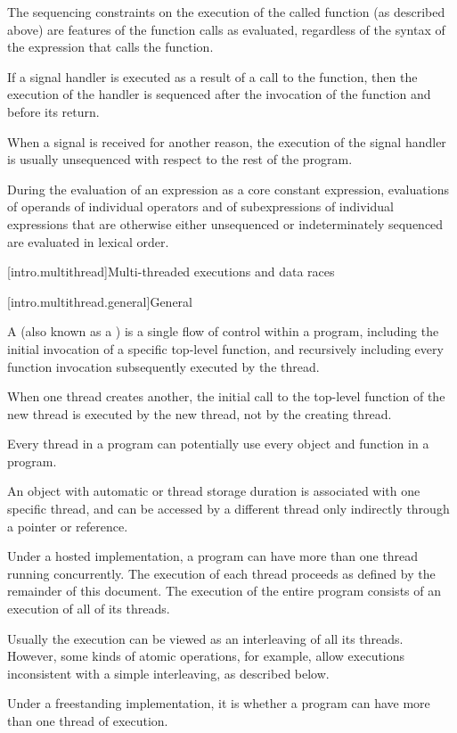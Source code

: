 \pnum
The sequencing constraints on the execution of the called function (as
described above) are features of the function calls as evaluated,
regardless of the syntax of the expression that calls the function.%
%

%
%
\pnum
If a signal handler is executed as a result of a call to the 
function, then the execution of the handler is sequenced after the invocation
of the  function and before its return.
\begin{note}
When a signal is received for another reason, the execution of the
signal handler is usually unsequenced with respect to the rest of the program.
\end{note}

\pnum
During the evaluation of an expression
as a core constant expression,
evaluations of operands of individual operators and
of subexpressions of individual expressions
that are otherwise either unsequenced or indeterminately sequenced
are evaluated in lexical order.

[intro.multithread]{Multi-threaded executions and data races}

[intro.multithread.general]{General}

\pnum
{}%
%
A  (also known as a ) is a single flow of
control within a program, including the initial invocation of a specific
top-level function, and recursively including every function invocation
subsequently executed by the thread.
\begin{note}
When one thread creates another,
the initial call to the top-level function of the new thread is executed by the
new thread, not by the creating thread.
\end{note}
Every thread in a program can
potentially use every object and function in a program.
\begin{footnote}
An object
with automatic or thread storage duration is associated with
one specific thread, and can be accessed by a different thread only indirectly
through a pointer or reference.
\end{footnote}
Under a hosted
implementation, a \Cpp{} program can have more than one thread running
concurrently. The execution of each thread proceeds as defined by the remainder
of this document. The execution of the entire program consists of an execution
of all of its threads.
\begin{note}
Usually the execution can be viewed as an
interleaving of all its threads. However, some kinds of atomic operations, for
example, allow executions inconsistent with a simple interleaving, as described
below.
\end{note}
%
Under a freestanding implementation, it is  whether a program can
have more than one thread of execution.


